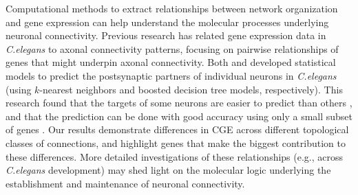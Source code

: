 {Computational methods to extract relationships between network organization and gene expression can help understand the molecular processes underlying neuronal connectivity.
Previous research has related gene expression data in \textit{C.elegans} to axonal connectivity patterns, focusing on pairwise relationships of genes that might underpin axonal connectivity.
Both \citet{Kaufman2006} and \citet{Baruch2008} developed statistical models to predict the postsynaptic partners of individual neurons in \textit{C.elegans} (using $k$-nearest neighbors and boosted decision tree models, respectively).
This research found that the targets of some neurons are easier to predict than others \citep{Kaufman2006}, and that the prediction can be done with good accuracy using only a small subset of genes \citep{Baruch2008}.
Our results demonstrate differences in CGE across different topological classes of connections, and highlight genes that make the biggest contribution to these differences.
More detailed investigations of these relationships (e.g., across \textit{C.elegans} development) may shed light on the molecular logic underlying the establishment and maintenance of neuronal connectivity.

}
